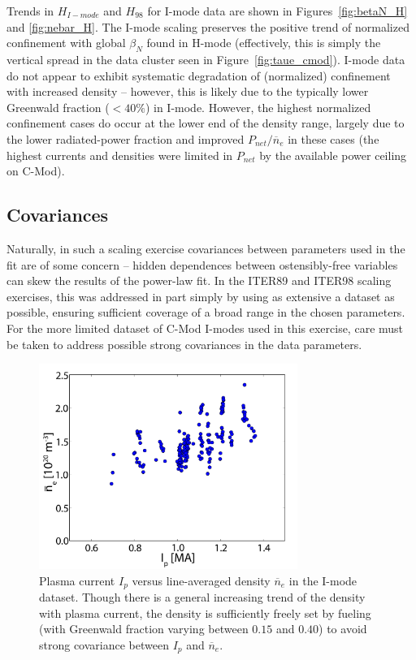 \documentclass[12pt]{iopart}
\begin{document}
\noindent Trends in $H_{I-mode}$ and $H_{98}$ for I-mode data are shown in Figures~\ref{fig:betaN_H} and \ref{fig:nebar_H}.
The I-mode scaling preserves the positive trend of normalized confinement with global $\beta_N$ found in H-mode (effectively, this is simply the vertical spread in the data cluster seen in Figure~\ref{fig:taue_cmod}).
I-mode data do not appear to exhibit systematic degradation of (normalized) confinement with increased density -- however, this is likely due to the typically lower Greenwald fraction ($<40\%$) in I-mode.
However, the highest normalized confinement cases do occur at the lower end of the density range, largely due to the lower radiated-power fraction and improved $P_{net}/\overline{n}_e$ in these cases (the highest currents and densities were limited in $P_{net}$ by the available power ceiling on C-Mod).

\subsection{Covariances}\label{subsec:covar}

Naturally, in such a scaling exercise covariances between parameters used in the fit are of some concern -- hidden dependences between ostensibly-free variables can skew the results of the power-law fit.
In the ITER89 and ITER98 scaling exercises, this was addressed in part simply by using as extensive a dataset as possible, ensuring sufficient coverage of a broad range in the chosen parameters.
For the more limited dataset of C-Mod I-modes used in this exercise, care must be taken to address possible strong covariances in the data parameters.

\begin{figure}[ht]
 \centering
 \includegraphics[width=0.75\textwidth]{Ip_nebar.pdf}
 \caption{Plasma current $I_p$ versus line-averaged density $\overline{n}_e$ in the I-mode dataset.  Though there is a general increasing trend of the density with plasma current, the density is sufficiently freely set by fueling (with Greenwald fraction varying between $0.15$ and $0.40$) to avoid strong covariance between $I_p$ and $\overline{n}_e$.}
 \label{fig:Ip_nebar}
\end{figure}
\end{document}
